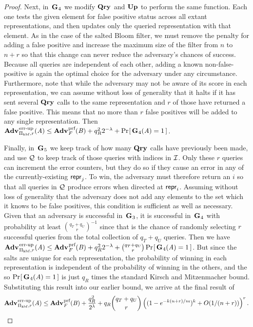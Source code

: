 \begin{proof}
Next, in~$\mathbf{G}\hspace{0.5pt}_4$ we modify $\mathbf{Qry}\hspace{0.5pt}$ and $\mathbf{Up}\hspace{0.5pt}$ to perform the same function. Each one tests the given element for false positive status across all extant representations, and then updates only the queried representation with that element. As in the case of the salted Bloom filter, we must remove the penalty for adding a false positive and increase the maximum size of the filter from $n$ to $n+r$ so that this change can never reduce the adversary's chances of success.  Because all queries are independent of each other, adding a known non-false-positive is again the optimal choice for the adversary under any circumstance. Furthermore, note that while the adversary may not be aware of its score in each representation, we can assume without loss of generality that it halts if it has sent several $\mathbf{Qry}\hspace{0.5pt}$ calls to the same representation and $r$ of those have returned a false positive. This means that no more than $r$ false positives will be added to any single representation. Then $\Adv{\errep}_{\struct_\prfbloom,r}(\advA) \le \Adv{\prf}_F(\advB) + q_R^22^{-\lambda} + \Prob{\G_4(\advA)=1}$.

Finally, in~$\mathbf{G}\hspace{0.5pt}_5$ we keep track of how many $\mathbf{Qry}\hspace{0.5pt}$ calls have previously been made, and use $\mathcal{Q}$ to keep track of those queries with indices in $\mathcal{I}$. Only these $r$ queries can increment the error counters, but they do so if they cause an error in any of the currently-existing $\mathsf{repr}_j$. To win, the adversary must therefore return an $i$ so that all queries in $\mathcal{Q}$ produce errors when directed at $\mathsf{repr}_i$. Assuming without loss of generality that the adversary does not add any elements to the set which it knows to be false positives, this condition is sufficient as well as necessary. Given that an adversary is successful in~$\mathbf{G}\hspace{0.5pt}_3$, it is successful in~$\mathbf{G}\hspace{0.5pt}_4$ with probability at least $\binom{q_T+q_U}{r}^{-1}$ since that is the chance of randomly selecting $r$ successful queries from the total collection of $q_T+q_U$ queries. Then we have $\Adv{\errep}_{\struct_\prfbloom,r}(\advA) \le \Adv{\prf}_F(\advB) + q_R^22^{-\lambda} + \binom{q_T+q_U}{r}\Prob{\G_4(\advA)=1}$. But since the salts are unique for each representation, the probability of winning in each representation is independent of the probability of winning in the others, and the so $\Pr\hspace{-1pt}\left[\,\mathbf{G}\hspace{0.5pt}_4(\mathit{A})=1\,\right]$ is just $q_R$ times the standard Kirsch and Mitzenmacher bound. Substituting this result into our earlier bound, we arrive at the final result of
$$\Adv{\errep}_{\struct_\prfbloom,r}(\advA) \le \Adv{\prf}_F(\advB) + \frac{q_R^2}{2^\lambda} + q_R\binom{q_T+q_U}{r}\left((1-e^{-k(n+r)/m})^k+O(1/(n+r))\right)^r.$$
\missingqed
\end{proof}

